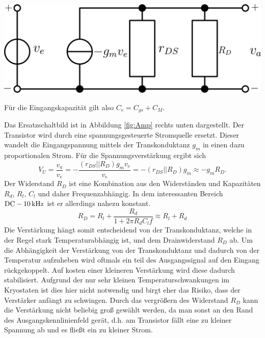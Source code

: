 \begin{minipage}[!b]{\textwidth}
\begin{minipage}[c]{0.6\textwidth}
\begin{minipage}[c]{0.5\textwidth}
\includegraphics[width=2\textwidth]{./fig/AmpEq.pdf}
\end{minipage}
\end{minipage}
\label{fig:Amp}
\end{minipage}
\vspace{1mm}
Für die Eingangskapazität gilt also $C_e = C_{gs} + C_M$.

Das Ersatzschaltbild ist in Abbildung \ref{fig:Amp} rechts unten dargestellt.
Der Transistor wird durch eine spannungsgesteuerte Stromquelle ersetzt.
Dieser wandelt die Eingangspannung mittels der Transkonduktanz $g_m$ in einen dazu proportionalen Strom.
Für die Spannungsverstärkung ergibt sich
\begin{equation}
V_U = \frac{v_a}{v_e} = -\frac{(r_{DS}||R_D)g_mv_e}{v_e} = -(r_{DS}||R_D)g_m \approx
-g_m R_D.
\end{equation}
Der Widerstand $R_D$ ist eine Kombination aus den Widerständen und Kapazitäten $R_d$, $R_l$, $C_l$ und daher Frequenzabhängig.
In dem interessanten Bereich $\text{DC} \-- \SI{10}{\kilo\hertz}$ ist er allerdings nahezu konstant.
\begin{equation}
R_D = R_l + \frac{R_d}{1 + 2\pi R_d C_l f} \approx R_l + R_d
\end{equation}
Die Verstärkung hängt somit entscheidend von der Transkonduktanz, welche in der Regel stark Temperaturabhängig ist, und dem Drainwiderstand $R_D$ ab.
Um die Abhängigkeit der Verstärkung von der Transkonduktanz und dadurch von der Temperatur aufzuheben wird oftmals ein teil des Ausgangssignal auf den Eingang rückgekoppelt.
Auf kosten einer kleineren Verstärkung wird diese dadurch stabilisiert.
Aufgrund der nur sehr kleinen Temperaturschwankungen im Kryostaten ist dies hier nicht notwendig und birgt eher das Risiko, dass der Verstärker anfängt zu schwingen.
Durch das vergrößern des Widerstand $R_D$ kann die Verstärkung nicht beliebig groß gewählt werden, da man sonst an den Rand des Ausgangskennlinienfeld gerät, d.h. am Transistor fällt eine zu kleiner Spannung ab und es fließt ein zu kleiner Strom.

